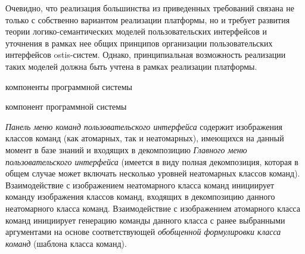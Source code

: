 \begin{scnitemize}
\begin{scnitemize}
Очевидно, что реализация большинства из приведенных требований связана не только с собственно вариантом реализации
платформы, но и требует развития теории логико-семантических моделей пользовательских интерфейсов и уточнения в
рамках нее общих принципов организации пользовательских интерфейсов ostis-систем. Однако, принципиальная возможность
реализации таких моделей должна быть учтена в рамках реализации платформы.

\begin{SCn}
\begin{scnrelfromlist}{компоненты программной системы}
    \begin{scnindent}
        \begin{scnrelfromlist}{компонент программной системы}
        \end{scnrelfromlist}
    \end{scnindent}
\end{scnrelfromlist}
\end{SCn}

\textit{Панель меню команд пользовательского интерфейса} содержит изображения классов команд (как атомарных, так и
неатомарных), имеющихся на данный момент в базе знаний и входящих в декомпозицию \textit{Главного меню пользовательского
интерфейса} (имеется в виду полная декомпозиция, которая в общем случае может включать несколько уровней неатомарных
классов команд). Взаимодействие с изображением неатомарного класса команд инициирует команду изображения классов
команд, входящих в декомпозицию данного неатомарного класса команд. Взаимодействие с изображением атомарного класса
команд инициирует генерацию команды данного класса с ранее выбранными аргументами на основе соответствующей
\textit{обобщенной формулировки класса команд} (шаблона класса команд).


\end{scnitemize}
\end{scnitemize}

